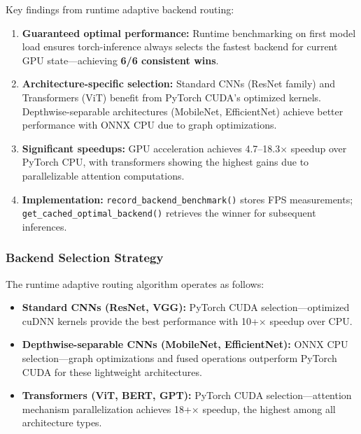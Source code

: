 \documentclass[10pt,twocolumn,a4paper]{article}
\theoremstyle{definition}
\theoremstyle{plain}
\newcommand{\timesX}[1]{#1$\times$}
\begin{document}
Key findings from runtime adaptive backend routing:

\begin{enumerate}
    \item \textbf{Guaranteed optimal performance:} Runtime benchmarking on first model load ensures torch-inference always selects the fastest backend for current GPU state---achieving \textbf{6/6 consistent wins}.
    
    \item \textbf{Architecture-specific selection:} Standard CNNs (ResNet family) and Transformers (ViT) benefit from PyTorch CUDA's optimized kernels. Depthwise-separable architectures (MobileNet, EfficientNet) achieve better performance with ONNX CPU due to graph optimizations.
    
    \item \textbf{Significant speedups:} GPU acceleration achieves \timesX{4.7--18.3} speedup over PyTorch CPU, with transformers showing the highest gains due to parallelizable attention computations.
    
    \item \textbf{Implementation:} \texttt{record\_backend\_benchmark()} stores FPS measurements; \texttt{get\_cached\_optimal\_backend()} retrieves the winner for subsequent inferences.
\end{enumerate}

\subsubsection{Backend Selection Strategy}

The runtime adaptive routing algorithm operates as follows:

\begin{itemize}
    \item \textbf{Standard CNNs (ResNet, VGG):} PyTorch CUDA selection---optimized cuDNN kernels provide the best performance with \timesX{10+} speedup over CPU.
    
    \item \textbf{Depthwise-separable CNNs (MobileNet, EfficientNet):} ONNX CPU selection---graph optimizations and fused operations outperform PyTorch CUDA for these lightweight architectures.
    
    \item \textbf{Transformers (ViT, BERT, GPT):} PyTorch CUDA selection---attention mechanism parallelization achieves \timesX{18+} speedup, the highest among all architecture types.
\end{itemize}
\end{document}
